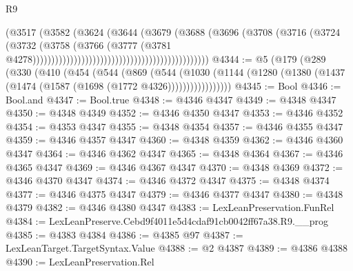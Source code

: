 \begin{lexlean}{R9}
\begin{coremodule}
                                                                    (@3517
                                                                      (@3582
                                                                        (@3624
                                                                          (@3644
                                                                            (@3679
                                                                              (@3688
                                                                                (@3696
                                                                                  (@3708
                                                                                    (@3716
                                                                                      (@3724
                                                                                        (@3732
                                                                                          (@3758
                                                                                            (@3766
                                                                                              (@3777
                                                                                                (@3781
                                                                                                  @4278)))))))))))))))))))))))))))))))))))))))))))))))
@4344 := @5
    (@179
      (@289
        (@330
          (@410
            (@454
              (@544
                (@869
                  (@544
                    (@1030
                      (@1144 (@1280 (@1380 (@1437 (@1474 (@1587 (@1698 (@1772 @4326)))))))))))))))))
@4345 := Bool
@4346 := Bool.and
@4347 := Bool.true
@4348 := @4346 @4347
@4349 := @4348 @4347
@4350 := @4348 @4349
@4352 := @4346 @4350 @4347
@4353 := @4346 @4352
@4354 := @4353 @4347
@4355 := @4348 @4354
@4357 := @4346 @4355 @4347
@4359 := @4346 @4357 @4347
@4360 := @4348 @4359
@4362 := @4346 @4360 @4347
@4364 := @4346 @4362 @4347
@4365 := @4348 @4364
@4367 := @4346 @4365 @4347
@4369 := @4346 @4367 @4347
@4370 := @4348 @4369
@4372 := @4346 @4370 @4347
@4374 := @4346 @4372 @4347
@4375 := @4348 @4374
@4377 := @4346 @4375 @4347
@4379 := @4346 @4377 @4347
@4380 := @4348 @4379
@4382 := @4346 @4380 @4347
@4383 := LexLeanPreservation.FunRel
@4384 := LexLeanPreserve.Cebd9f4011e5d4cdaf91cb0042ff67a38.R9.__prog
@4385 := @4383 @4384
@4386 := @4385 @97
@4387 := LexLeanTarget.TargetSyntax.Value
@4388 := @2 @4387
@4389 := @4386 @4388
@4390 := LexLeanPreservation.Rel

\end{coremodule}
\end{lexlean}
